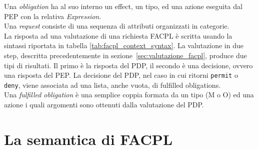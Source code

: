 Una \textit{obligation} ha al suo interno un effect, un tipo, ed una azione eseguita dal PEP con la relativa \textit{Expression}.\\
Una \textit{request} consiste di una sequenza di attributi organizzati in categorie.\\
La risposta ad una valutazione di una richiesta FACPL è scritta usando la sintassi riportata in tabella \ref{tab:facpl_context_syntax}.
La valutazione in due step, descritta precedentemente in sezione~\ref{sec:valutazione_facpl}, produce due tipi di risultati. Il primo è la risposta del PDP, il secondo è una decisione, ovvero una risposta del PEP.
La decisione del PDP, nel caso in cui ritorni \texttt{permit} o \texttt{deny}, viene associata ad una lista, anche vuota, di fulfilled obligations.\\
Una \textit{fulfilled obligation} è una semplice coppia formata da un tipo (M o O) ed una azione i quali argomenti sono ottenuti dalla valutazione del PDP.

\section{La semantica di FACPL}
\label{sec:semantica_originale}

